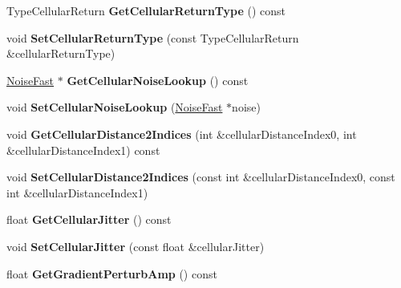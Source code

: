 \begin{DoxyCompactItemize}
Type\+Cellular\+Return {\bfseries Get\+Cellular\+Return\+Type} () const
\item 
\mbox{\label{class_flounder_1_1_noise_fast_a5bfcdc6835869f38729ace0aee8f49a3}} 
void {\bfseries Set\+Cellular\+Return\+Type} (const Type\+Cellular\+Return \&cellular\+Return\+Type)
\item 
\mbox{\label{class_flounder_1_1_noise_fast_a1f39e53cc0aa6d2586f8eafd06d91081}} 
\hyperlink{class_flounder_1_1_noise_fast}{Noise\+Fast} $\ast$ {\bfseries Get\+Cellular\+Noise\+Lookup} () const
\item 
\mbox{\label{class_flounder_1_1_noise_fast_a6420566626d5efccb1882c5edb547e7c}} 
void {\bfseries Set\+Cellular\+Noise\+Lookup} (\hyperlink{class_flounder_1_1_noise_fast}{Noise\+Fast} $\ast$noise)
\item 
\mbox{\label{class_flounder_1_1_noise_fast_a02da797d30df7d658487c25485ec1234}} 
void {\bfseries Get\+Cellular\+Distance2\+Indices} (int \&cellular\+Distance\+Index0, int \&cellular\+Distance\+Index1) const
\item 
\mbox{\label{class_flounder_1_1_noise_fast_a7596633ac997403eb45dc206516e6b46}} 
void {\bfseries Set\+Cellular\+Distance2\+Indices} (const int \&cellular\+Distance\+Index0, const int \&cellular\+Distance\+Index1)
\item 
\mbox{\label{class_flounder_1_1_noise_fast_a9fba15f6ebae9b29abd20534335a8aa6}} 
float {\bfseries Get\+Cellular\+Jitter} () const
\item 
\mbox{\label{class_flounder_1_1_noise_fast_aae783bba75a201eea5dacd8ebd3bf318}} 
void {\bfseries Set\+Cellular\+Jitter} (const float \&cellular\+Jitter)
\item 
\mbox{\label{class_flounder_1_1_noise_fast_ac90de70bda5fc7a9f26efd820adfeba4}} 
float {\bfseries Get\+Gradient\+Perturb\+Amp} () const
\item 
\mbox{\label{class_flounder_1_1_noise_fast_ad97afa9b6ee0780a247fc7eb62dcc2a3}} 

\end{DoxyCompactItemize}
